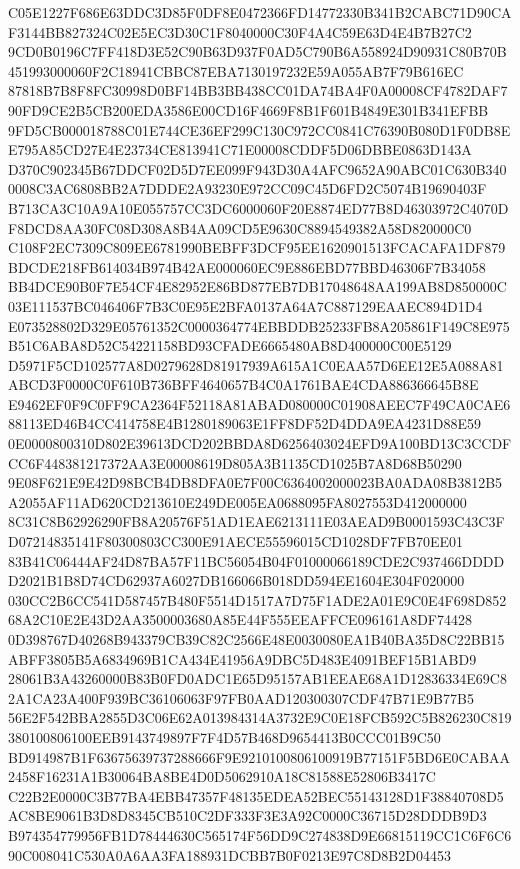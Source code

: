 \documentclass[UTF8,fontset=fandol,zihao=-4,a4paper]{ctexart}
\begin{document}
{{C05E1227F686E63DDC3D85F0DF8E0472366FD14772330B341B2CABC71D90CAF3144BB827324C02E5EC3D30C1F8040000C30F4A4C59E63D4E4B7B27C2
9CD0B0196C7FF418D3E52C90B63D937F0AD5C790B6A558924D90931C80B70B451993000060F2C18941CBBC87EBA7130197232E59A055AB7F79B616EC
87818B7B8F8FC30998D0BF14BB3BB438CC01DA74BA4F0A00008CF4782DAF790FD9CE2B5CB200EDA3586E00CD16F4669F8B1F601B4849E301B341EFBB
9FD5CB000018788C01E744CE36EF299C130C972CC0841C76390B080D1F0DB8EE795A85CD27E4E23734CE813941C71E00008CDDF5D06DBBE0863D143A
D370C902345B67DDCF02D5D7EE099F943D30A4AFC9652A90ABC01C630B3400008C3AC6808BB2A7DDDE2A93230E972CC09C45D6FD2C5074B19690403F
B713CA3C10A9A10E055757CC3DC6000060F20E8874ED77B8D46303972C4070DF8DCD8AA30FC08D308A8B4AA09CD5E9630C8894549382A58D820000C0
C108F2EC7309C809EE6781990BEBFF3DCF95EE1620901513FCACAFA1DF879BDCDE218FB614034B974B42AE000060EC9E886EBD77BBD46306F7B34058
BB4DCE90B0F7E54CF4E82952E86BD877EB7DB17048648AA199AB8D850000C03E111537BC046406F7B3C0E95E2BFA0137A64A7C887129EAAEC894D1D4
E073528802D329E05761352C0000364774EBBDDB25233FB8A205861F149C8E975B51C6ABA8D52C54221158BD93CFADE6665480AB8D400000C00E5129
D5971F5CD102577A8D0279628D81917939A615A1C0EAA57D6EE12E5A088A81ABCD3F0000C0F610B736BFF4640657B4C0A1761BAE4CDA886366645B8E
E9462EF0F9C0FF9CA2364F52118A81ABAD080000C01908AEEC7F49CA0CAE688113ED46B4CC414758E4B1280189063E1FF8DF52D4DDA9EA4231D88E59
0E0000800310D802E39613DCD202BBDA8D6256403024EFD9A100BD13C3CCDFCC6F448381217372AA3E00008619D805A3B1135CD1025B7A8D68B50290
9E08F621E9E42D98BCB4DB8DFA0E7F00C6364002000023BA0ADA08B3812B5A2055AF11AD620CD213610E249DE005EA0688095FA8027553D412000000
8C31C8B62926290FB8A20576F51AD1EAE6213111E03AEAD9B0001593C43C3FD07214835141F80300803CC300E91AECE55596015CD1028DF7FB70EE01
83B41C06444AF24D87BA57F11BC56054B04F01000066189CDE2C937466DDDDD2021B1B8D74CD62937A6027DB166066B018DD594EE1604E304F020000
030CC2B6CC541D587457B480F5514D1517A7D75F1ADE2A01E9C0E4F698D85268A2C10E2E43D2AA3500003680A85E44F555EEAFFCE096161A8DF74428
0D398767D40268B943379CB39C82C2566E48E0030080EA1B40BA35D8C22BB15ABFF3805B5A6834969B1CA434E41956A9DBC5D483E4091BEF15B1ABD9
28061B3A43260000B83B0FD0ADC1E65D95157AB1EEAE68A1D12836334E69C82A1CA23A400F939BC36106063F97FB0AAD120300307CDF47B71E9B77B5
56E2F542BBA2855D3C06E62A013984314A3732E9C0E18FCB592C5B826230C819380100806100EEB9143749897F7F4D57B468D9654413B0CCC01B9C50
BD914987B1F63675639737288666F9E9210100806100919B77151F5BD6E0CABAA2458F16231A1B30064BA8BE4D0D5062910A18C81588E52806B3417C
C22B2E0000C3B77BA4EBB47357F48135EDEA52BEC55143128D1F38840708D5AC8BE9061B3D8D8345CB510C2DF333F3E3A92C0000C36715D28DDDB9D3
B974354779956FB1D78444630C565174F56DD9C274838D9E66815119CC1C6F6C690C008041C530A0A6AA3FA188931DCBB7B0F0213E97C8D8B2D04453
}}
\end{document}
